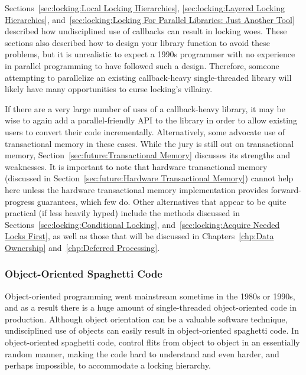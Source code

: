Sections~\ref{sec:locking:Local Locking Hierarchies},
\ref{sec:locking:Layered Locking Hierarchies},
and~\ref{sec:locking:Locking For Parallel Libraries: Just Another Tool}
described how undisciplined use of callbacks can result in locking
woes.
These sections also described how to design your library function to
avoid these problems, but it is unrealistic to expect a 1990s programmer
with no experience in parallel programming to have followed such a design.
Therefore, someone attempting to parallelize an existing callback-heavy
single-threaded library will likely have many opportunities to curse
locking's villainy.

If there are a very large number of uses of a callback-heavy library,
it may be wise to again add a parallel-friendly API to the library in
order to allow existing users to convert their code incrementally.
Alternatively, some advocate use of transactional memory in these cases.
While the jury is still out on transactional memory,
Section~\ref{sec:future:Transactional Memory} discusses its strengths and
weaknesses.
It is important to note that hardware transactional memory
(discussed in
Section~\ref{sec:future:Hardware Transactional Memory})
cannot help here unless the hardware transactional memory implementation
provides forward-progress guarantees, which few do.
Other alternatives that appear to be quite practical (if less heavily
hyped) include the methods discussed in
Sections~\ref{sec:locking:Conditional Locking},
and~\ref{sec:locking:Acquire Needed Locks First},
as well as those that will be discussed in
Chapters~\ref{chp:Data Ownership}
and~\ref{chp:Deferred Processing}.

\subsubsection{Object-Oriented Spaghetti Code}
\label{sec:locking:Object-Oriented Spaghetti Code}

Object-oriented programming went mainstream sometime in the 1980s or
1990s, and as a result there is a huge amount of single-threaded
object-oriented code in production.
Although object orientation can be a valuable software technique,
undisciplined use of objects can easily result in object-oriented
spaghetti code.
In object-oriented spaghetti code, control flits from object to object
in an essentially random manner, making the code hard to understand
and even harder, and perhaps impossible, to accommodate a locking hierarchy.


